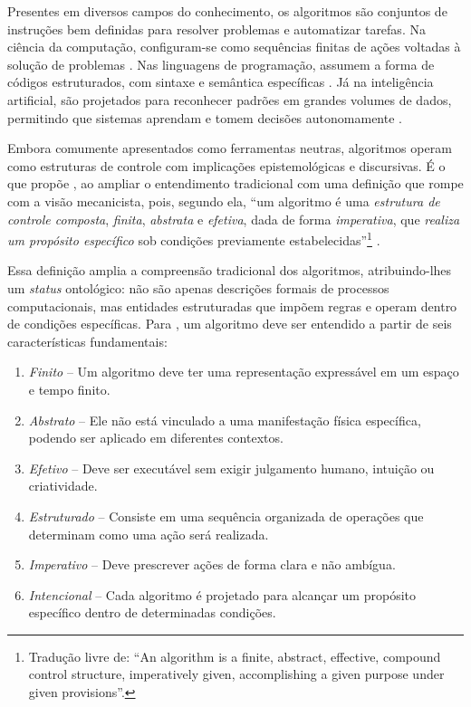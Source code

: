 \documentclass[portuguese]{textolivre}
\begin{document}
Presentes em diversos campos do conhecimento, os algoritmos são conjuntos de instruções bem definidas para resolver problemas e automatizar tarefas. Na ciência da computação, configuram-se como sequências finitas de ações voltadas à solução de problemas \cite{setzer1992}. Nas linguagens de programação, assumem a forma de códigos estruturados, com sintaxe e semântica específicas \cite{ludermir2021}. Já na inteligência artificial, são projetados para reconhecer padrões em grandes volumes de dados, permitindo que sistemas aprendam e tomem decisões autonomamente \cite{alhasnawi2024}.

Embora comumente apresentados como ferramentas neutras, algoritmos operam como estruturas de controle com implicações epistemológicas e discursivas. É o que propõe \textcite{hill2016}, ao ampliar o entendimento tradicional com uma definição que rompe com a visão mecanicista, pois, segundo ela, “um algoritmo é uma \emph{estrutura de controle composta}, \emph{finita}, \emph{abstrata} e \emph{efetiva}, dada de forma \emph{imperativa}, que \emph{realiza um propósito específico} sob condições previamente estabelecidas”\footnote{Tradução livre de: “An algorithm is a finite, abstract, effective, compound control structure, imperatively given, accomplishing a given purpose under given provisions”.} \cite[p. 47, grifos nossos, tradução nossa]{hill2016}.

Essa definição amplia a compreensão tradicional dos algoritmos, atribuindo-lhes um \textit{status} ontológico: não são apenas descrições formais de processos computacionais, mas entidades estruturadas que impõem regras e operam dentro de condições específicas. Para \textcite{hill2016}, um algoritmo deve ser entendido a partir de seis características fundamentais:

\begin{enumerate}
    \item \emph{Finito} – Um algoritmo deve ter uma representação expressável em um espaço e tempo finito.
    \item \emph{Abstrato} – Ele não está vinculado a uma manifestação física específica, podendo ser aplicado em diferentes contextos.
    \item \emph{Efetivo} – Deve ser executável sem exigir julgamento humano, intuição ou criatividade.
    \item \emph{Estruturado} – Consiste em uma sequência organizada de operações que determinam como uma ação será realizada.
    \item \emph{Imperativo} – Deve prescrever ações de forma clara e não ambígua.
    \item \emph{Intencional} – Cada algoritmo é projetado para alcançar um propósito específico dentro de determinadas condições.
\end{enumerate}
   
\end{document}
